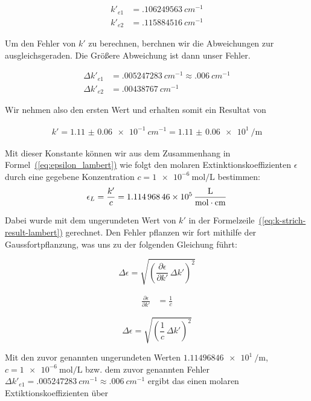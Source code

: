 \documentclass{article}
\let\OrigRef\ref
\renewcommand{\ref}[1]{{\color{linkblue}\uline{\OrigRef{#1}}}}
\renewcommand{\eqref}[1]{{\color{linkblue}\uline{\textup{(\OrigRef{#1})}}}}
\begin{document}
\begin{align}
	k'_{e1} &= \qty{.106249563}{cm^{-1}}\\
	k'_{e2} &= \qty{.115884516}{cm^{-1}}	
\end{align}

Um den Fehler von $k'$ zu berechnen, berchnen wir die Abweichungen zur ausgleichsgeraden. Die Größere
Abweichung ist dann unser Fehler.

\begin{align}
	\Delta k'_{e1} &= \qty{.005247283}{cm^{-1}} \approx \qty{.006}{cm^{-1}} \\
	\Delta k'_{e2} &= \qty{.00438767}{cm^{-1}}	
\end{align}

Wir nehmen also den ersten Wert und erhalten somit ein Resultat von

\begin{align}
	\boxed{ k' = 
		\qty{1.11(6)e-1}{cm^{-1}} = \qty{1.11(6)e1}{\per \meter}
	}
	\label{eq:k-strich-result-lambert}
\end{align}

Mit dieser Konstante können wir aus dem Zusammenhang in Formel~\eqref{eq:epsilon_lambert} wie folgt den 
molaren Extinktionskoeffizienten $\epsilon$ durch eine gegebene Konzentration 
$c=\qty{1e-6}{\mole \per \liter}$ bestimmen:
\begin{align}
	\epsilon_L = \frac{k'}{c} = \qty{1.11496846e5}{\frac{\liter}{\mol \cdot cm}}
\end{align}

Dabei wurde mit dem ungerundeten Wert von $k'$ in der Formelzeile~\eqref{eq:k-strich-result-lambert} 
gerechnet. Den Fehler pflanzen wir fort mithilfe der Gaussfortpflanzung, was uns zu der folgenden
Gleichung führt:

\begin{equation} 
	\Delta \epsilon = \sqrt{\left(\frac{\partial \epsilon}{\partial k'}\,\Delta k'\right)^2} 
\end{equation}

\begin{align}
  	\frac{\partial \epsilon}{\partial k'} &= \frac{1}{c}
\end{align}

\begin{equation} 
	\Delta \epsilon = \sqrt{\left(\frac{1}{c}\,\Delta k'\right)^2} 
\end{equation}

Mit den zuvor genannten ungerundeten Werten $\qty{1.11496846e1}{\per \meter}$, 
$c=\qty{1e-6}{\mole \per \liter}$ bzw. dem zuvor genannten
Fehler $\Delta k'_{e1} = \qty{.005247283}{cm^{-1}} \approx \qty{.006}{cm^{-1}}$ 
ergibt das einen molaren Extiktionskoeffizienten über
\end{document}

